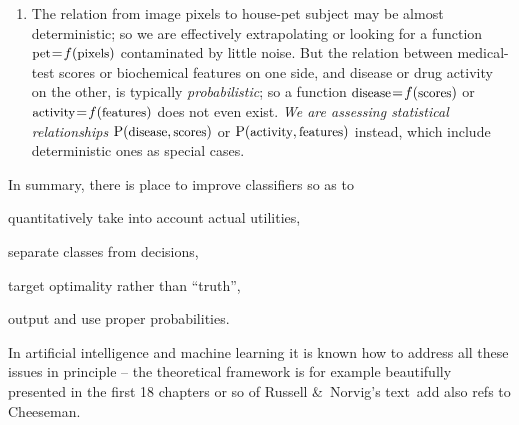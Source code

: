 \documentclass[\ifafour a4paper,12pt,\else a5paper,10pt,\fi%
onecolumn,oneside,article,%
british%
]{memoir}
\theoremstyle{remark}
\theoremstyle{innote}
\newcommand*{\amp}{\&}
\newcommand*{\wrench}{{\fontencoding{U}\fontfamily{fontawesomethree}\selectfont\symbol{114}}}
\newcommand{\mynotew}[1]{{\footnotesize\color{notecolour}\wrench\ #1}}
\renewcommand*{\P}{\mathrm{P}}%
\renewcommand*{\|}[1][]{\nonscript\:#1\vert\nonscript\:\mathopen{}}
\newcommand*{\mo}[1][=]{\mathrel{\mkern-3.5mu#1\mkern-3.5mu}}
\newcommand*{\texts}[1]{\text{\small #1}}
\begin{document}
\begin{enumerate}[label=(\roman*),wide]
  
\item\label{item:determ_statist} The relation from image pixels to house-pet subject may be almost deterministic; so we are effectively extrapolating or looking for a function $\texts{pet} \mo f(\texts{pixels})$ contaminated by little noise. But the relation between medical-test scores or biochemical features on one side, and disease or drug activity on the other, is typically \emph{probabilistic}; so a function $\texts{disease} \mo f(\texts{scores})$
  or $\texts{activity} \mo f(\texts{features})$
  does not even exist. \emph{We are assessing statistical relationships} $\P(\texts{disease} , \texts{scores})$ or $\P(\texts{activity} , \texts{features})$ instead, which include deterministic ones as special cases.

\end{enumerate}

In summary, there is place to improve classifiers so as to
\begin{enumerate*}[label=(\roman*)]
\item quantitatively take into account actual utilities,
\item separate classes from decisions,
\item target optimality rather than \enquote{truth}, %
\item output and use proper probabilities.
\end{enumerate*}

\medskip

In artificial intelligence and machine learning it is known how to address all these issues in principle -- the theoretical framework is for example beautifully presented in the first 18 chapters or so of Russell \amp\ Norvig's \parencites*{russelletal1995_r2022} text\mynotew{add also refs to Cheeseman}.
\end{document}
